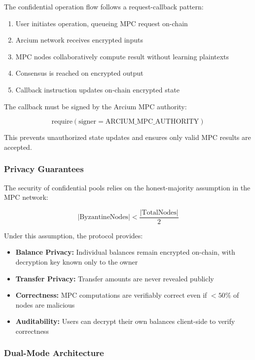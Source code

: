 \documentclass[11pt,a4paper]{article}
\begin{document}
The confidential operation flow follows a request-callback pattern:

\begin{enumerate}
\item User initiates operation, queueing MPC request on-chain
\item Arcium network receives encrypted inputs
\item MPC nodes collaboratively compute result without learning plaintexts
\item Consensus is reached on encrypted output
\item Callback instruction updates on-chain encrypted state
\end{enumerate}

The callback must be signed by the Arcium MPC authority:

\begin{equation}
\text{require}(\text{signer} = \text{ARCIUM\_MPC\_AUTHORITY})
\end{equation}

This prevents unauthorized state updates and ensures only valid MPC results are accepted.

\subsubsection{Privacy Guarantees}

The security of confidential pools relies on the honest-majority assumption in the MPC network:

\begin{equation}
|\text{ByzantineNodes}| < \frac{|\text{TotalNodes}|}{2}
\end{equation}

Under this assumption, the protocol provides:

\begin{itemize}
\item \textbf{Balance Privacy:} Individual balances remain encrypted on-chain, with decryption key known only to the owner
\item \textbf{Transfer Privacy:} Transfer amounts are never revealed publicly
\item \textbf{Correctness:} MPC computations are verifiably correct even if $< 50\%$ of nodes are malicious
\item \textbf{Auditability:} Users can decrypt their own balances client-side to verify correctness
\end{itemize}

\subsubsection{Dual-Mode Architecture}
\end{document}
